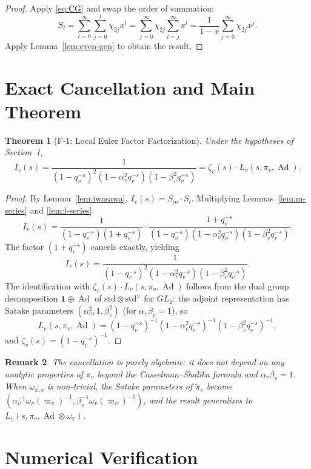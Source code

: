 \documentclass[12pt]{article}
\newtheorem{theorem}{Theorem}[section]
\newtheorem{remark}[theorem]{Remark}
\DeclareMathOperator{\Ad}{Ad}
\begin{document}
\begin{proof}
Apply \eqref{eq:CG} and swap the order of summation:
\[
  S_l = \sum_{l=0}^\infty \sum_{j=0}^l \chi_{2j} x^l
  = \sum_{j=0}^\infty \chi_{2j} \sum_{l=j}^\infty x^l
  = \frac{1}{1-x} \sum_{j=0}^\infty \chi_{2j} x^j.
\]
Apply Lemma~\ref{lem:even-gen} to obtain the result.
\end{proof}

\section{Exact Cancellation and Main Theorem}

\begin{theorem}[F-1: Local Euler Factor Factorization]\label{thm:F1}
Under the hypotheses of Section~1,
\[
  I_v(s)
  = \frac{1}{(1-q_v^{-s})^2(1-\alpha_v^2 q_v^{-s})(1-\beta_v^2 q_v^{-s})}
  = \zeta_v(s) \cdot L_v(s, \pi_v, \Ad).
\]
\end{theorem}

\begin{proof}
By Lemma~\ref{lem:iwasawa}, $I_v(s) = S_m \cdot S_l$.  Multiplying
Lemmas~\ref{lem:m-series} and \ref{lem:l-series}:
\[
  I_v(s)
  = \frac{1}{(1-q_v^{-s})(1+q_v^{-s})}
    \cdot
    \frac{1+q_v^{-s}}{(1-q_v^{-s})(1-\alpha_v^2 q_v^{-s})(1-\beta_v^2 q_v^{-s})}.
\]
The factor $(1+q_v^{-s})$ cancels exactly, yielding
\[
  I_v(s)
  = \frac{1}{(1-q_v^{-s})^2(1-\alpha_v^2 q_v^{-s})(1-\beta_v^2 q_v^{-s})}.
\]
The identification with $\zeta_v(s) \cdot L_v(s,\pi_v,\Ad)$ follows from the
dual group decomposition $\mathbf{1} \oplus \Ad$ of $\mathrm{std} \otimes \mathrm{std}^\vee$
for $GL_2$: the adjoint representation has Satake parameters $(\alpha_v^2, 1, \beta_v^2)$
(for $\alpha_v \beta_v = 1$), so
\[
  L_v(s,\pi_v,\Ad)
  = (1-q_v^{-s})^{-1}(1-\alpha_v^2 q_v^{-s})^{-1}(1-\beta_v^2 q_v^{-s})^{-1},
\]
and $\zeta_v(s) = (1-q_v^{-s})^{-1}$.
\end{proof}

\begin{remark}
The cancellation is purely algebraic: it does not depend on any analytic properties
of $\pi_v$ beyond the Casselman--Shalika formula and $\alpha_v \beta_v = 1$.
When $\omega_{\pi,v}$ is non-trivial, the Satake parameters of $\tilde\pi_v$ become
$(\alpha_v^{-1}\omega_v(\varpi_v)^{-1}, \beta_v^{-1}\omega_v(\varpi_v)^{-1})$,
and the result generalizes to $L_v(s,\pi_v,\Ad \otimes \omega_\pi)$.
\end{remark}

\section{Numerical Verification}
\end{document}
